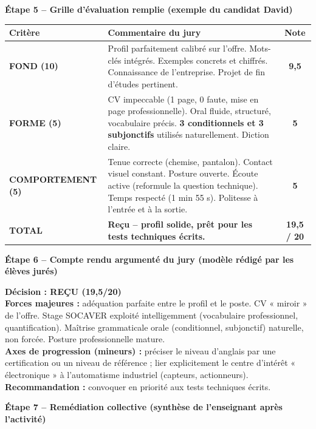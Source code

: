 \documentclass[11pt]{article}
\begin{document}
\textbf{Étape 5 -- Grille d'évaluation remplie (exemple du candidat David)}

\begin{center}
\begin{tabularx}{\linewidth}{|l|X|c|}
\hline
\textbf{Critère} & \textbf{Commentaire du jury} & \textbf{Note} \\
\hline
\textbf{FOND (10)} & Profil parfaitement calibré sur l'offre. Mots-clés intégrés. Exemples concrets et chiffrés. Connaissance de l'entreprise. Projet de fin d'études pertinent. & \textbf{9,5} \\
\hline
\textbf{FORME (5)} & CV impeccable (1 page, 0 faute, mise en page professionnelle). Oral fluide, structuré, vocabulaire précis. \textbf{3 conditionnels et 3 subjonctifs} utilisés naturellement. Diction claire. & \textbf{5} \\
\hline
\textbf{COMPORTEMENT (5)} & Tenue correcte (chemise, pantalon). Contact visuel constant. Posture ouverte. Écoute active (reformule la question technique). Temps respecté (1 min 55 s). Politesse à l'entrée et à la sortie. & \textbf{5} \\
\hline
\textbf{TOTAL} & \textbf{Reçu -- profil solide, prêt pour les tests techniques écrits.} & \textbf{19,5 / 20} \\
\hline
\end{tabularx}
\end{center}

\textbf{Étape 6 -- Compte rendu argumenté du jury (modèle rédigé par les élèves jurés)}

\begin{exemplebox}
\textbf{Décision : REÇU (19,5/20)} \\
\textbf{Forces majeures :} adéquation parfaite entre le profil et le poste. CV « miroir » de l'offre. Stage SOCAVER exploité intelligemment (vocabulaire professionnel, quantification). Maîtrise grammaticale orale (conditionnel, subjonctif) naturelle, non forcée. Posture professionnelle mature. \\
\textbf{Axes de progression (mineurs) :} préciser le niveau d'anglais par une certification ou un niveau de référence ; lier explicitement le centre d'intérêt « électronique » à l'automatisme industriel (capteurs, actionneurs). \\
\textbf{Recommandation :} convoquer en priorité aux tests techniques écrits.
\end{exemplebox}

\textbf{Étape 7 -- Remédiation collective (synthèse de l'enseignant après l'activité)}
\end{document}
